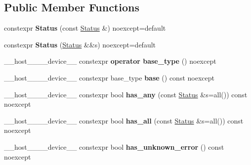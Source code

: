 \subsection*{Public Member Functions}
\begin{DoxyCompactItemize}
\item 
\mbox{\label{classwarpcore_1_1Status_a27b4acace2406734dcdf5ce4e1e6af71}} 
constexpr {\bfseries Status} (const \hyperlink{classwarpcore_1_1Status}{Status} \&) noexcept=default
\item 
\mbox{\label{classwarpcore_1_1Status_a9246cd59682078466195e75d44e20aaf}} 
constexpr {\bfseries Status} (\hyperlink{classwarpcore_1_1Status}{Status} \&\&s) noexcept=default
\item 
\mbox{\label{classwarpcore_1_1Status_affd3effa31a4a85104b691c5d074e0e8}} 
\+\_\+\+\_\+host\+\_\+\+\_\+\+\_\+\+\_\+device\+\_\+\+\_\+ constexpr {\bfseries operator base\+\_\+type} () noexcept
\item 
\mbox{\label{classwarpcore_1_1Status_ae52d09de9f4d0edc1a82dd9abe949c05}} 
\+\_\+\+\_\+host\+\_\+\+\_\+\+\_\+\+\_\+device\+\_\+\+\_\+ constexpr base\+\_\+type {\bfseries base} () const noexcept
\item 
\mbox{\label{classwarpcore_1_1Status_a7c67c7914bad36717f100ed33e25baab}} 
\+\_\+\+\_\+host\+\_\+\+\_\+\+\_\+\+\_\+device\+\_\+\+\_\+ constexpr bool {\bfseries has\+\_\+any} (const \hyperlink{classwarpcore_1_1Status}{Status} \&s=all()) const noexcept
\item 
\mbox{\label{classwarpcore_1_1Status_a0e5badc89fc3fa0cdde54136aba62bc1}} 
\+\_\+\+\_\+host\+\_\+\+\_\+\+\_\+\+\_\+device\+\_\+\+\_\+ constexpr bool {\bfseries has\+\_\+all} (const \hyperlink{classwarpcore_1_1Status}{Status} \&s=all()) const noexcept
\item 
\mbox{\label{classwarpcore_1_1Status_afe2744717c4c602d64012c2e928a13fc}} 
\+\_\+\+\_\+host\+\_\+\+\_\+\+\_\+\+\_\+device\+\_\+\+\_\+ constexpr bool {\bfseries has\+\_\+unknown\+\_\+error} () const noexcept
\item 
\mbox{\label{classwarpcore_1_1Status_aa66c0dfa15c46db54ef313c813c8aef9}} 

\end{DoxyCompactItemize}
